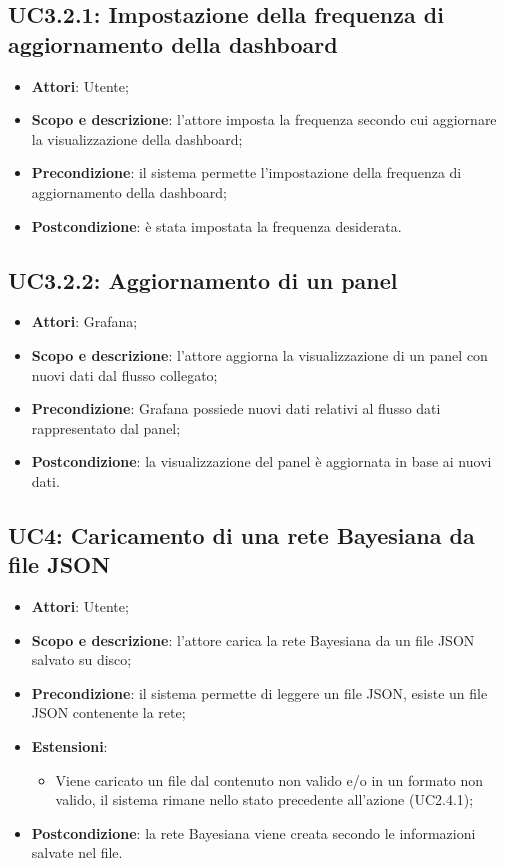 \subsection{UC3.2.1: Impostazione della frequenza di aggiornamento della dashboard}
\hypertarget{UC3.2.1}{}
\begin{itemize}
	\item \textbf{Attori}: Utente;
	\item \textbf{Scopo e descrizione}: l'attore imposta la frequenza secondo cui aggiornare la visualizzazione della dashboard;
	\item \textbf{Precondizione}: il sistema permette l'impostazione della frequenza di aggiornamento della dashboard;
	\item \textbf{Postcondizione}: è stata impostata la frequenza desiderata.
\end{itemize}

\subsection{UC3.2.2: Aggiornamento di un panel}
\hypertarget{UC3.2.2}{}
\begin{itemize}
	\item \textbf{Attori}: Grafana;
	\item \textbf{Scopo e descrizione}: l'attore aggiorna la visualizzazione di un panel con nuovi dati dal flusso collegato;
	\item \textbf{Precondizione}: Grafana possiede nuovi dati relativi al flusso dati rappresentato dal panel;
	\item \textbf{Postcondizione}: la visualizzazione del panel è aggiornata in base ai nuovi dati.
\end{itemize}

\subsection{UC4: Caricamento di una rete Bayesiana da file JSON}
\hypertarget{UC9}{}
\begin{itemize}
	\item \textbf{Attori}: Utente;
	\item \textbf{Scopo e descrizione}: l'attore carica la rete Bayesiana da un file JSON salvato su disco;
	\item \textbf{Precondizione}: il sistema permette di leggere un file JSON, esiste un file JSON contenente la rete;
	\item \textbf{Estensioni}:
	\begin{itemize}
		\item Viene caricato un file dal contenuto non valido e/o in un formato non valido, il sistema rimane nello stato precedente all'azione (UC2.4.1);
	\end{itemize}
	\item \textbf{Postcondizione}: la rete Bayesiana viene creata secondo le informazioni salvate nel file.
\end{itemize}